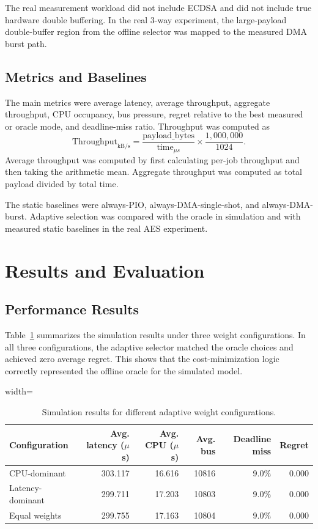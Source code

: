 \documentclass[conference]{IEEEtran}
\begin{document}
The real measurement workload did not include ECDSA and did not include true hardware double buffering. In the real 3-way experiment, the large-payload double-buffer region from the offline selector was mapped to the measured DMA burst path.

\subsection{Metrics and Baselines}
The main metrics were average latency, average throughput, aggregate throughput, CPU occupancy, bus pressure, regret relative to the best measured or oracle mode, and deadline-miss ratio. Throughput was computed as
\begin{equation}
\text{Throughput}_{\text{kB/s}} = \frac{\text{payload\_bytes}}{\text{time}_{\mu s}} \times \frac{1{,}000{,}000}{1024}.
\label{eq:throughput}
\end{equation}
Average throughput was computed by first calculating per-job throughput and then taking the arithmetic mean. Aggregate throughput was computed as total payload divided by total time.

The static baselines were always-PIO, always-DMA-single-shot, and always-DMA-burst. Adaptive selection was compared with the oracle in simulation and with measured static baselines in the real AES experiment.

\section{Results and Evaluation}
\subsection{Performance Results}
Table~\ref{tab:weight_results} summarizes the simulation results under three weight configurations. In all three configurations, the adaptive selector matched the oracle choices and achieved zero average regret. This shows that the cost-minimization logic correctly represented the offline oracle for the simulated model.

\begin{table}[ht!]
\centering
\caption{Simulation results for different adaptive weight configurations.}
\label{tab:weight_results}
\scriptsize
\begin{adjustbox}{width=\columnwidth}
\begin{tabular}{lrrrrr}
\toprule
\textbf{Configuration} & \textbf{Avg. latency ($\mu$s)} & \textbf{Avg. CPU ($\mu$s)} & \textbf{Avg. bus} & \textbf{Deadline miss} & \textbf{Regret} \\
\midrule
CPU-dominant & 303.117 & 16.616 & 10816 & 9.0\% & 0.000 \\
Latency-dominant & 299.711 & 17.203 & 10803 & 9.0\% & 0.000 \\
Equal weights & 299.755 & 17.163 & 10804 & 9.0\% & 0.000 \\
\bottomrule
\end{tabular}
\end{adjustbox}
\end{table}
\end{document}
